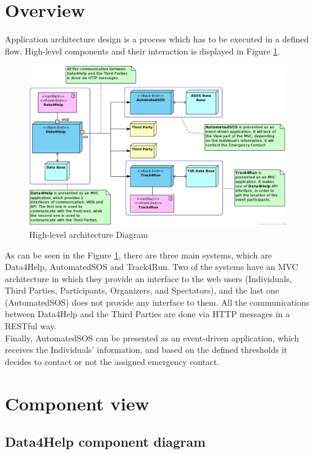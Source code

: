\documentclass[a4paper, hidelinks, 12pt]{report}
\begin{document}
	\section{Overview}
	\label{sec:overview}
	Application architecture design is a process which has to be executed in a defined flow. High-level components and their interaction is displayed in Figure \ref{fig:High-level architecture Diagram}.
	\begin{figure}[H]
		\centering
		\includegraphics[width=1\textwidth]{diagrams/architecture.png}
		\caption[High-level architecture Diagram]{High-level architecture Diagram}
		\label{fig:High-level architecture Diagram}
	\end{figure}
	
	As can be seen in the Figure \ref{fig:High-level architecture Diagram}, there are three main systems, which are Data4Help, AutomatedSOS and Track4Run. Two of the systems have an MVC architecture in which they provide an interface to the web users (Individuals, Third Parties, Participants, Organizers, and Spectators), and the last one (AutomatedSOS) does not provide any interface to them. All the communications between Data4Help and the Third Parties are done via HTTP messages in a RESTful way. \\
	
	Finally, AutomatedSOS can be presented as an event-driven application, which receives the Individuals' information, and based on the defined thresholds it decides to contact or not the assigned emergency contact.

	\section{Component view}
		\subsection{Data4Help component diagram}
\end{document}
